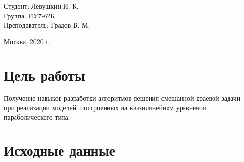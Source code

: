 \documentclass[a4paper,12pt]{article}
\begin{document}
	\large
	\begin{flushright}
		Студент: Левушкин И. К. \\
		Группа: ИУ7-62Б \\
		Преподаватель: Градов В. М. \\
	\end{flushright}
	
	\vspace*{25mm}
	\begin{center}
		Москва, 2020 г.  
	\end{center}
	\thispagestyle{empty}
	
	
	\newpage
	
	\section*{Цель работы}
	
	Получение навыков разработки  алгоритмов решения смешанной краевой задачи при реализации моделей, построенных на квазилинейном уравнении параболического типа.
	
	\section*{Исходные данные}
	
\end{document}
